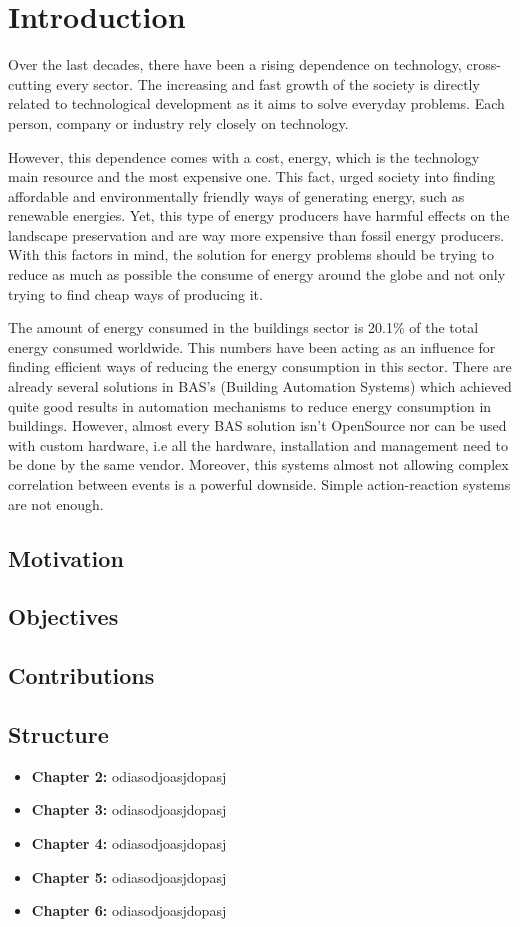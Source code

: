 

\chapter{Introduction}
\label{chapter:introduction}

Over the last decades, there have been a rising dependence on technology, cross-cutting every sector. The increasing and fast growth of the society is directly related to technological development as it aims to solve everyday problems. Each person, company or industry rely closely on technology.


However, this dependence comes with a cost, energy, which is the technology main resource and the most expensive one. This fact, urged society into finding affordable and environmentally friendly ways of generating energy, such as renewable energies. Yet, this type of energy producers have harmful effects on the landscape preservation and are way more expensive than fossil energy producers. With this factors in mind, the solution for energy problems should be trying to reduce as much as possible the consume of energy around the globe and not only trying to find cheap ways of producing it.

The amount of energy consumed in the buildings sector is 20.1\% of the total energy consumed worldwide. This numbers have been acting as an influence for finding efficient ways of reducing the energy consumption in this sector. There are already several solutions in BAS's (Building Automation Systems) which achieved quite good results in automation mechanisms to reduce energy consumption in buildings. However, almost every BAS solution isn't OpenSource nor can be used with custom hardware, i.e all the hardware, installation and management need to be done by the same vendor. Moreover, this systems almost not allowing complex correlation between events is a powerful downside. Simple action-reaction systems are not enough. 

\section{Motivation}


\section{Objectives}


\section{Contributions}


\section{Structure}

\begin{itemize}

	\item{\textbf{Chapter 2:} odiasodjoasjdopasj}
	\item{\textbf{Chapter 3:} odiasodjoasjdopasj}
	\item{\textbf{Chapter 4:} odiasodjoasjdopasj}
	\item{\textbf{Chapter 5:} odiasodjoasjdopasj}
	\item{\textbf{Chapter 6:} odiasodjoasjdopasj}

\end{itemize}